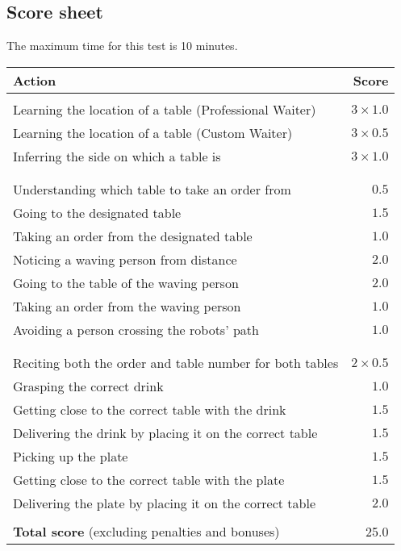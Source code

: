 

\subsection{Score sheet}
The maximum time for this test is 10 minutes.

\begin{tabularx}{\textwidth}{ X r }
	\textbf{Action} & \textbf{Score} \\ \hline
	\textbi{Training phase}  \\
	Learning the location of a table (Professional Waiter) & $3 \times 1.0$ \\
	Learning the location of a table (Custom Waiter) & $3 \times 0.5$ \\
	Inferring the side on which a table is & $3 \times 1.0$ \\
	\\
	\textbi{Ordering phase}  \\
	Understanding which table to take an order from & $0.5$ \\
	Going to the designated table & $1.5$ \\
	Taking an order from the designated table & $1.0$ \\
	Noticing a waving person from distance & $2.0$ \\
	Going to the table of the waving person & $2.0$ \\
	Taking an order from the waving person & $1.0$ \\
	Avoiding a person crossing the robots' path & $1.0$ \\
	\\
	\textbi{Delivering phase}  \\
	Reciting both the order and table number for both tables & $2 \times 0.5$ \\
	Grasping the correct drink & $1.0$ \\
	Getting close to the correct table with the drink & $1.5$ \\
	Delivering the drink by placing it on the correct table & $1.5$ \\
	Picking up the plate & $1.5$ \\
	Getting close to the correct table with the plate & $1.5$ \\
	Delivering the plate by placing it on the correct table & $2.0$ \\
	\\ \hline
	\textbf{Total score} (excluding penalties and bonuses) & 25.0 \\
\end{tabularx}